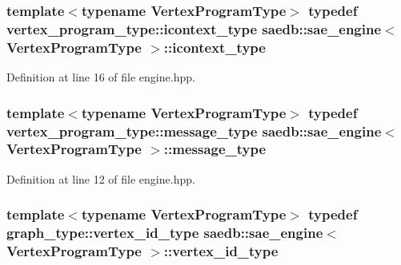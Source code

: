 \hypertarget{classsaedb_1_1sae__engine_a57877f66118a797fff3915a78ee42f22}{
\subsubsection[{icontext\-\_\-type}]{\setlength{\rightskip}{0pt plus 5cm}template$<$typename Vertex\-Program\-Type$>$ typedef vertex\-\_\-program\-\_\-type\-::icontext\-\_\-type {\bf saedb\-::sae\-\_\-engine}$<$ Vertex\-Program\-Type $>$\-::{\bf icontext\-\_\-type}}}\label{d9/d3c/classsaedb_1_1sae__engine_a57877f66118a797fff3915a78ee42f22}


Definition at line 16 of file engine.\-hpp.

\hypertarget{classsaedb_1_1sae__engine_a58d400cce9eb7d2940ba43724d60f6af}{
\subsubsection[{message\-\_\-type}]{\setlength{\rightskip}{0pt plus 5cm}template$<$typename Vertex\-Program\-Type$>$ typedef vertex\-\_\-program\-\_\-type\-::message\-\_\-type {\bf saedb\-::sae\-\_\-engine}$<$ Vertex\-Program\-Type $>$\-::{\bf message\-\_\-type}}}\label{d9/d3c/classsaedb_1_1sae__engine_a58d400cce9eb7d2940ba43724d60f6af}


Definition at line 12 of file engine.\-hpp.

\hypertarget{classsaedb_1_1sae__engine_a50de6c2ffe1f5c800cef952d84b2e66b}{
\subsubsection[{vertex\-\_\-id\-\_\-type}]{\setlength{\rightskip}{0pt plus 5cm}template$<$typename Vertex\-Program\-Type$>$ typedef {\bf graph\-\_\-type\-::vertex\-\_\-id\-\_\-type} {\bf saedb\-::sae\-\_\-engine}$<$ Vertex\-Program\-Type $>$\-::{\bf vertex\-\_\-id\-\_\-type}}}\label{d9/d3c/classsaedb_1_1sae__engine_a50de6c2ffe1f5c800cef952d84b2e66b}


